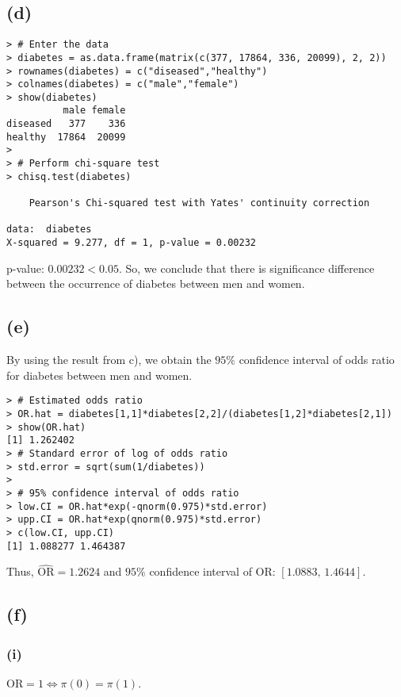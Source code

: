 \vspace{\baselineskip}
\subsection*{(d)}
\begin{lstlisting}
> # Enter the data
> diabetes = as.data.frame(matrix(c(377, 17864, 336, 20099), 2, 2))
> rownames(diabetes) = c("diseased","healthy")
> colnames(diabetes) = c("male","female")
> show(diabetes)
          male female
diseased   377    336
healthy  17864  20099
> 
> # Perform chi-square test
> chisq.test(diabetes)

	Pearson's Chi-squared test with Yates' continuity correction

data:  diabetes
X-squared = 9.277, df = 1, p-value = 0.00232
\end{lstlisting}

p-value: $0.00232 < 0.05$. So, we conclude that there is significance difference between the occurrence of diabetes between men and women.


\vspace{\baselineskip}
\subsection*{(e)}
By using the result from c), we obtain the $95\%$ confidence interval of odds ratio for diabetes between men and women.

\begin{lstlisting}
> # Estimated odds ratio
> OR.hat = diabetes[1,1]*diabetes[2,2]/(diabetes[1,2]*diabetes[2,1])
> show(OR.hat)
[1] 1.262402
> # Standard error of log of odds ratio
> std.error = sqrt(sum(1/diabetes))
> 
> # 95% confidence interval of odds ratio
> low.CI = OR.hat*exp(-qnorm(0.975)*std.error)
> upp.CI = OR.hat*exp(qnorm(0.975)*std.error)
> c(low.CI, upp.CI)
[1] 1.088277 1.464387
\end{lstlisting}

Thus, $\widehat{\mathrm{OR}} = 1.2624$ and $95\%$ confidence interval of $\mathrm{OR}$: $[1.0883, \, 1.4644]$.

\vspace{\baselineskip}
\subsection*{(f)}

\subsubsection*{(i)}
$\mathrm{OR} = 1 \iff \pi(0) = \pi(1)$.

